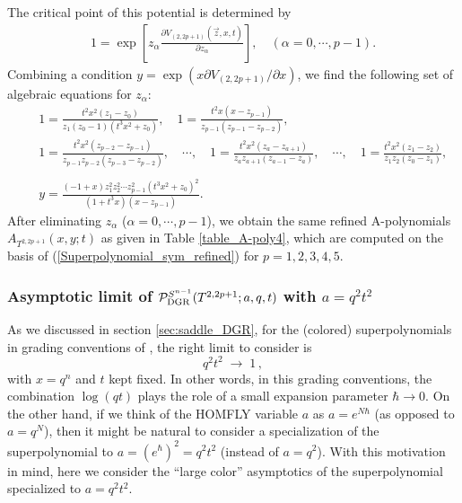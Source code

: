 \documentclass[hyper,letterpaper]{JHEP3}
\newcommand{\be}{\begin{equation}}
\newcommand{\ee}{\end{equation}}
\renewcommand{\P}{{\cal P}}
\begin{document}
The critical point of this potential is determined by
\begin{eqnarray}
1=\exp\left[z_{\alpha}\frac{\partial  V_{(2,2p+1)}(\vec{z},x,t)}{\partial z_{\alpha}}\right],\quad (\alpha=0,\cdots,p-1).
\end{eqnarray}
Combining a condition $y=\exp\left(x\partial V_{(2,2p+1)} /\partial x\right)$,
we find the following set of algebraic equations for $z_{\alpha}$:
\begin{eqnarray}
&&1=\frac{t^2 x^2 (z_{1} - z_{0})}{z_{1} (z_{0}-1) (t^3 x^2 +
 z_0)},
\quad
1=\frac{t^2 x (x - z_{p-1})}{z_{p-1} (z_{p-1} - z_{p-2})},
\nonumber \\
&&1=\frac{t^2 x^2 (z_{p-2}-z_{p-1})}{z_{p-1}z_{p-2}(z_{p-3}-z_{p-2})},
 \quad\cdots,\quad
1=\frac{t^2 x^2 (z_a - z_{a+1})}{z_a z_{a+1}(z_{a-1}-z_{a})},
\quad \cdots,\quad
1=\frac{t^2 x^2 (z_{1} - z_{2})}{z_{1} z_{2}(z_{0}-z_{1})},
\nonumber \\
&&
\nonumber \\
&&y=\frac{(-1 + x) z_1^2 z_2^2\cdots z_{p-1}^2 (t^3 x^2 + z_0)^2}{(1 + t^3 x) (x - z_{p-1})}.
\end{eqnarray}
After eliminating $z_{\alpha}$ ($\alpha=0,\cdots,p-1$), we obtain
the same refined A-polynomials $A_{T^{2,2p+1}}(x,y;t)$ as given in Table \ref{table_A-poly4},
which are computed on the basis of (\ref{Superpolynomial_sym_refined}) for $p=1,2,3,4,5$.



\subsubsection{Asymptotic limit of  $\P^{S^{n-1}}_{\rm{DGR}}(T^{2,2p+1};a,q,t)$ with $a=q^2 t^2$}
\label{sec:DGR_another}

As we discussed in section \ref{sec:saddle_DGR},
for the (colored) superpolynomials in grading conventions of \cite{DGR}, the right limit to consider is
\be
q^2 t^2 \; \to \; 1 \,,
\ee
with $x = q^n$ and $t$ kept fixed. In other words, in this grading conventions,
the combination $\log (qt)$ plays the role of a small expansion parameter $\hbar \to 0$.
On the other hand, if we think of the HOMFLY variable $a$ as $a = e^{N \hbar}$ (as opposed to $a=q^N$),
then it might be natural to consider a specialization of the superpolynomial to $a = (e^{\hbar})^2 = q^2 t^2$ (instead of $a=q^2$).
With this motivation in mind, here we consider the ``large color'' asymptotics of the superpolynomial
specialized to $a = q^2 t^2$.
\end{document}
